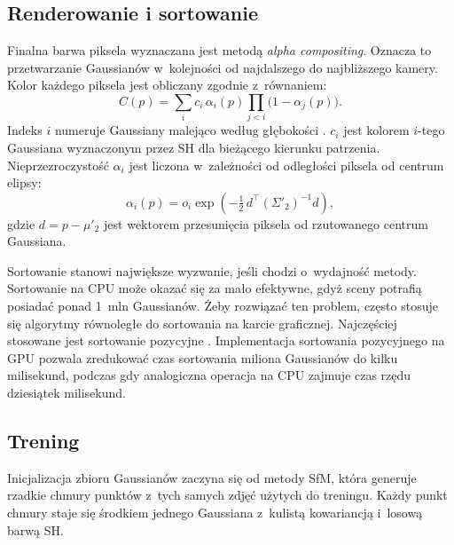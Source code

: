 \subsection{Renderowanie i sortowanie}
\label{subsec:renderowanie}

Finalna barwa piksela wyznaczana jest metodą \textit{alpha compositing}.
Oznacza to przetwarzanie Gaussianów w~kolejności od najdalszego do
najbliższego kamery. Kolor każdego piksela jest obliczany zgodnie
z~równaniem:
\begin{equation}
  C(p) = \sum_{i} c_i\, \alpha_i(p) \prod_{j<i} \bigl(1 - \alpha_j(p)\bigr).
  \label{eq:compositing}
\end{equation}
Indeks $i$ numeruje Gaussiany malejąco według głębokości .
$c_i$ jest kolorem $i$-tego Gaussiana wyznaczonym przez SH dla bieżącego
kierunku patrzenia. Nieprzezroczystość $\alpha_i$ jest liczona w~zależności od
odległości piksela od centrum elipsy:
\begin{equation}
  \alpha_i(p) = o_i \exp\!\left(-\tfrac{1}{2}\, d^{\top} \left(\Sigma'_2\right)^{-1} d\right),
  \label{eq:alpha}
\end{equation}
gdzie $d = p - \mu'_2$ jest wektorem przesunięcia piksela od rzutowanego
centrum Gaussiana.

Sortowanie stanowi największe wyzwanie, jeśli chodzi o~wydajność metody.
Sortowanie na CPU może okazać się za mało efektywne, gdyż sceny potrafią
posiadać ponad 1~mln Gaussianów. Żeby rozwiązać ten problem, często stosuje się
algorytmy równoległe do sortowania na karcie graficznej. Najczęściej stosowane
jest sortowanie pozycyjne . Implementacja sortowania
pozycyjnego na GPU pozwala zredukować czas sortowania miliona Gaussianów do
kilku milisekund, podczas gdy analogiczna operacja na CPU zajmuje czas rzędu
dziesiątek milisekund.

\subsection{Trening}
\label{subsec:trening}

Inicjalizacja zbioru Gaussianów zaczyna się od metody SfM, która generuje
rzadkie chmury punktów z~tych samych zdjęć użytych do treningu. Każdy punkt
chmury staje się środkiem jednego Gaussiana z~kulistą kowariancją i~losową
barwą SH.


